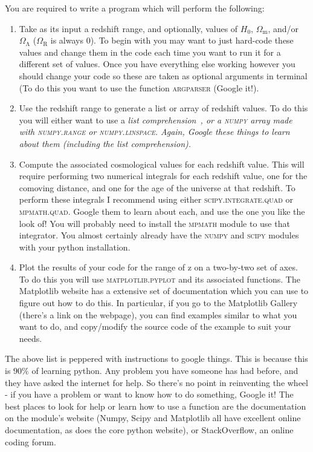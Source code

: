 \documentclass[]{article}
\begin{document}
You are required to write a program which will perform the following: 
\begin{enumerate}

\item Take as its input a redshift range, and optionally, values of $H_0$, $\Omega_\mathrm{m}$, and/or $\Omega_\mathrm{\Lambda}$ ($\Omega_\mathrm{R}$ is always $0$). To begin with you may want to just hard-code these values and change them in the code each time you want to run it for a different set of values. Once you have everything else working however you should change your code so these are taken as optional arguments in terminal (To do this you want to use the function \textsc{argparser} (Google it!). 
\item Use the redshift range to generate a list or array of redshift values. To do this you will either want to use a \itshape list comprehension~\upshape, or a \textsc{numpy} array made with \textsc{numpy.range} or \textsc{numpy.linspace}. Again, Google these things to learn about them (including the list comprehension). 
\item Compute the associated cosmological values for each redshift value. This will require performing two numerical integrals for each redshift value, one for the comoving distance, and one for the age of the universe at that redshift. To perform these integrals I recommend using either \textsc{scipy.integrate.quad} or \textsc{mpmath.quad}. Google them to learn about each, and use the one you like the look of! You will probably need to install the \textsc{mpmath} module to use that integrator. You almost certainly already have the \textsc{numpy} and \textsc{scipy} modules with your python installation. 
\item Plot the results of your code for the range of z on a two-by-two set of axes. To do this you will use \textsc{matplotlib.pyplot} and its associated functions. The Matplotlib website has a extensive set of documentation which you can use to figure out how to do this. In particular, if you go to the Matplotlib Gallery (there's a link on the webpage), you can find examples similar to what you want to do, and copy/modify the source code of the example to suit your needs. \\
\end{enumerate}

\noindent The above list is peppered with instructions to google things. This is because this is $90\%$ of learning python. Any problem you have someone has had before, and they have asked the internet for help. So there's no point in reinventing the wheel - if you have a problem or want to know how to do something, Google it! The best places to look for help or learn how to use a function are the documentation on the module's website (Numpy, Scipy and Matplotlib all have excellent online documentation, as does the core python website), or StackOverflow, an online coding forum. 
\end{document}
